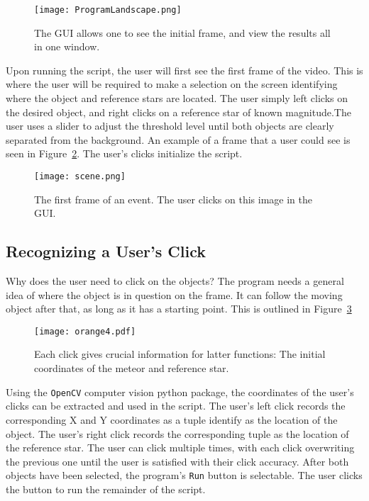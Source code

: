 \begin{figure}[htpb]
	\centering
	\texttt{[image: ProgramLandscape.png]}
	\caption{The GUI allows one to see the initial frame, and view the results all in one window.}
	\label{fig:gui}
\end{figure}

Upon running the script, the user will first see the first frame of the video. This is where the user will be required to make a selection on the screen identifying where the object and reference stars are located. The user simply left clicks on the desired object, and right clicks on a reference star of known magnitude.The user uses a slider to adjust the threshold level until both objects are clearly separated from the background. An example of a frame that a user could see is seen in Figure~\ref{fig:scene}. The user's clicks initialize the script. 

\begin{figure}[ht!]
	\centering
	\texttt{[image: scene.png]}
	\caption{The first frame of an event. The user clicks on this image in the GUI.}
	\label{fig:scene}
\end{figure}

\subsection{Recognizing a User's Click}

Why does the user need to click on the objects? The program needs a general idea of where the object is in question on the frame. It can follow the moving object after that, as long as it has a starting point. This is outlined in Figure~\ref{fig:clickfinder}

\begin{figure}[h!]
	\centering
	\texttt{[image: orange4.pdf]}
	\caption{Each click gives crucial information for latter functions: The initial coordinates of the meteor and reference star.}
	\label{fig:clickfinder}
\end{figure}

Using the \texttt{OpenCV} computer vision python package, the coordinates of the user's clicks can be extracted and used in the script. The user's left click records the corresponding X and Y coordinates as a tuple identify as the location of the object. The user's right click records the corresponding tuple as the location of the reference star. The user can click multiple times, with each click overwriting the previous one until the user is satisfied with their click accuracy. After both objects have been selected, the program's \texttt{Run} button is selectable. The user clicks the button to run the remainder of the script.

